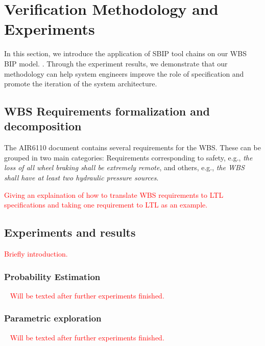 

\section{Verification Methodology and Experiments}

In this section, we introduce the application of SBIP tool chains on our WBS BIP model. . Through the experiment results, we demonstrate that our methodology can help system engineers improve the role of specification and promote the iteration of the system architecture.

\subsection{WBS Requirements formalization and decomposition}
The AIR6110 document contains several requirements for the WBS. These can be grouped in two main categories: Requirements corresponding to safety, e.g., \emph{the loss of all wheel braking shall be extremely remote}, and others, e.g., \emph{the WBS shall have at least two hydraulic pressure sources}.

\textcolor{red}{
Giving an explaination of how to translate WBS requirements to LTL specifications and taking one requirement to LTL as an example.
}

\subsection{Experiments and results}
\textcolor{red}{
Briefly introduction.
}

\subsubsection{Probability Estimation}
\
\newline
\textcolor{red}{
\indent Will be texted after further experiments finished.
}

\subsubsection{Parametric exploration}
\
\newline
\textcolor{red}{
	\indent Will be texted after further experiments finished.
}